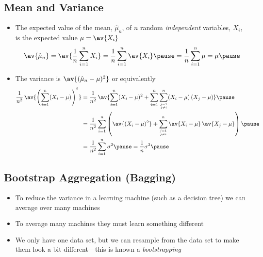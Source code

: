 
\begin{slide}
\section[-2]{Mean and Variance}

\begin{PauseHighLight}\small
  \begin{itemize}
  \item The expected value of the mean, $\hat{\mu}_n$, of $n$ random
    \emph{independent} variables, $X_i$, is the expected value $\mu=\av{X_i}$
    \begin{align*}
      \av{\hat{\mu}_n}
      =\av{\frac{1}{n} \sum_{i=1}^n X_i } = \frac{1}{n} \sum_{i=1}^n
      \av{X_i} \pause = \frac{1}{n} \sum_{i=1}^n \mu = \mu\pause
    \end{align*}
  \item The variance is $\av{ (\hat{\mu}_n-\mu)^2 }$ or equivalently 
    \begin{align*}
      \frac{1}{n^2} \, \av{ \left(\sum_{i=1}^n (X_i -\mu)\right)^2}
      &=\frac{1}{n^2} \, \av{ \sum_{i=1}^n (X_i -\mu)^2
        + \sum_{i=1}^n\sum_{j=1\atop j\neq i}^n (X_i-\mu)\,(X_j-\mu)}\pause\\
      &= \frac{1}{n^2}\sum_{i=1}^n \left( \av{(X_i -\mu)^2}
        + \sum_{j=1\atop j\neq i}^n
      \av{X_i-\mu}\,\av{X_j-\mu} \right)\pause\\
      &=\frac{1}{n^2} \sum_{i=1}^n \sigma^2\pause = \frac{1}{n} \sigma^2
        \pause
    \end{align*}
  \end{itemize}
\end{PauseHighLight}


\end{slide}


\begin{slide}
\section[-2]{Bootstrap Aggregation (Bagging)}

\pb
\begin{itemize}
\item To reduce the variance in a learning machine (such as a decision
  tree) we can average over many machines\pauseh
\item To average many machines they must learn something different\pauseh
\item We only have one data set, but we can resample from the data set
  to make them look a bit different\pauseh---this is known a
  \emph{bootstrapping}\pauseh
\end{itemize}
\begin{center}
  \pause
\end{center}

\end{slide}


